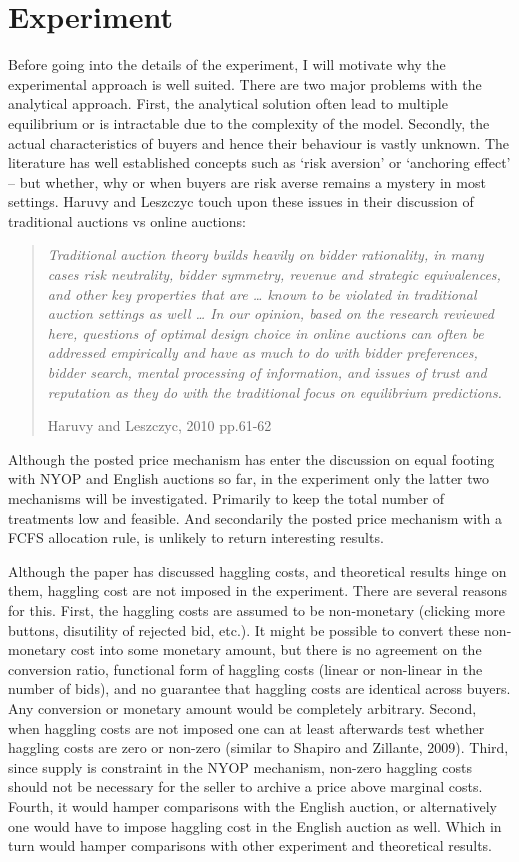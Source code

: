 \documentclass[a4paper,12pt]{article}
\begin{document}
	\section{Experiment}

	Before going into the details of the experiment, I will motivate why the experimental approach is well suited. There are two major problems with the analytical approach. First, the analytical solution often lead to multiple equilibrium or is intractable due to the complexity of the model. Secondly, the actual characteristics of buyers and hence their behaviour is vastly unknown. The literature has well established concepts such as `risk aversion' or `anchoring effect' -- but whether, why or when buyers are risk averse remains a mystery in most settings. Haruvy and Leszczyc touch upon these issues in their discussion of traditional auctions vs online auctions:
	\blockquote[Haruvy and Leszczyc, 2010 pp.61-62]{\emph{Traditional auction theory builds heavily on bidder rationality, in many cases risk neutrality, bidder symmetry, revenue and strategic equivalences, and other key properties that are … known to be violated in traditional auction settings as well … In our opinion, based on the research reviewed here, questions of optimal design choice in online auctions can often be addressed empirically and have as much to do with bidder preferences, bidder search, mental processing of information, and issues of trust and reputation as they do with the traditional focus on equilibrium predictions. }}

Although the posted price mechanism has enter the discussion on equal footing with NYOP and English auctions so far, in the experiment only the latter two mechanisms will be investigated. Primarily to keep the total number of treatments low and feasible. And secondarily the posted price mechanism with a FCFS allocation rule, is unlikely to return interesting results. 

Although the paper has discussed haggling costs, and theoretical results hinge on them, haggling cost are not imposed in the experiment. There are several reasons for this. First, the haggling costs are assumed to be non-monetary (clicking more buttons, disutility of rejected bid, etc.). It might be possible to convert these non-monetary cost into some monetary amount, but there is no agreement on the conversion ratio, functional form of haggling costs (linear or non-linear in the number of bids), and no guarantee that haggling costs are identical across buyers. Any conversion or monetary amount would be completely arbitrary. Second, when haggling costs are not imposed one can at least afterwards test whether haggling costs are zero or non-zero (similar to Shapiro and Zillante, 2009). Third, since supply is constraint in the NYOP mechanism, non-zero haggling costs should not be necessary for the seller to archive a price above marginal costs. Fourth, it would hamper comparisons with the English auction, or alternatively one would have to impose haggling cost in the English auction as well. Which in turn would hamper comparisons with other experiment and theoretical results. 
\end{document}
